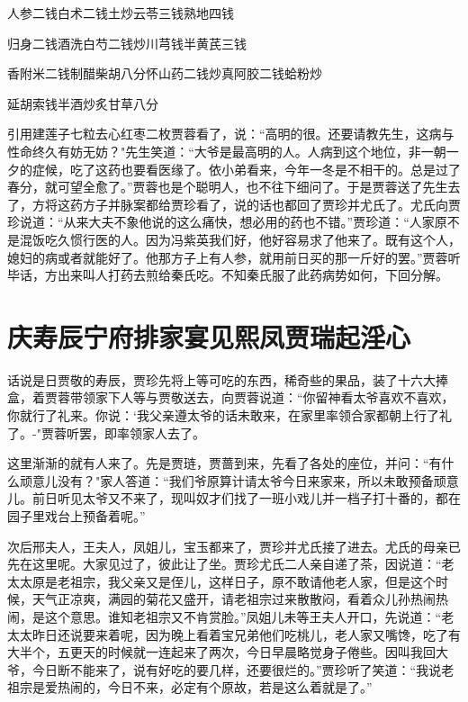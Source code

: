 人参二钱白术二钱土炒云苓三钱熟地四钱

归身二钱酒洗白芍二钱炒川芎钱半黄芪三钱

香附米二钱制醋柴胡八分怀山药二钱炒真阿胶二钱蛤粉炒

延胡索钱半酒炒炙甘草八分

引用建莲子七粒去心红枣二枚贾蓉看了，说：“高明的很。还要请教先生，这病与性命终久有妨无妨？"先生笑道：“大爷是最高明的人。人病到这个地位，非一朝一夕的症候，吃了这药也要看医缘了。依小弟看来，今年一冬是不相干的。总是过了春分，就可望全愈了。”贾蓉也是个聪明人，也不往下细问了。于是贾蓉送了先生去了，方将这药方子并脉案都给贾珍看了，说的话也都回了贾珍并尤氏了。尤氏向贾珍说道：“从来大夫不象他说的这么痛快，想必用的药也不错。”贾珍道：“人家原不是混饭吃久惯行医的人。因为冯紫英我们好，他好容易求了他来了。既有这个人，媳妇的病或者就能好了。他那方子上有人参，就用前日买的那一斤好的罢。”贾蓉听毕话，方出来叫人打药去煎给秦氏吃。不知秦氏服了此药病势如何，下回分解。

\chapter{庆寿辰宁府排家宴\ttlbreak 见熙凤贾瑞起淫心}

话说是日贾敬的寿辰，贾珍先将上等可吃的东西，稀奇些的果品，装了十六大捧盒，着贾蓉带领家下人等与贾敬送去，向贾蓉说道：“你留神看太爷喜欢不喜欢，你就行了礼来。你说：`我父亲遵太爷的话未敢来，在家里率领合家都朝上行了礼了。-"贾蓉听罢，即率领家人去了。

这里渐渐的就有人来了。先是贾琏，贾蔷到来，先看了各处的座位，并问：“有什么顽意儿没有？"家人答道：“我们爷原算计请太爷今日来家来，所以未敢预备顽意儿。前日听见太爷又不来了，现叫奴才们找了一班小戏儿并一档子打十番的，都在园子里戏台上预备着呢。”

次后邢夫人，王夫人，凤姐儿，宝玉都来了，贾珍并尤氏接了进去。尤氏的母亲已先在这里呢。大家见过了，彼此让了坐。贾珍尤氏二人亲自递了茶，因说道：“老太太原是老祖宗，我父亲又是侄儿，这样日子，原不敢请他老人家，但是这个时候，天气正凉爽，满园的菊花又盛开，请老祖宗过来散散闷，看着众儿孙热闹热闹，是这个意思。谁知老祖宗又不肯赏脸。”凤姐儿未等王夫人开口，先说道：“老太太昨日还说要来着呢，因为晚上看着宝兄弟他们吃桃儿，老人家又嘴馋，吃了有大半个，五更天的时候就一连起来了两次，今日早晨略觉身子倦些。因叫我回大爷，今日断不能来了，说有好吃的要几样，还要很烂的。”贾珍听了笑道：“我说老祖宗是爱热闹的，今日不来，必定有个原故，若是这么着就是了。”

